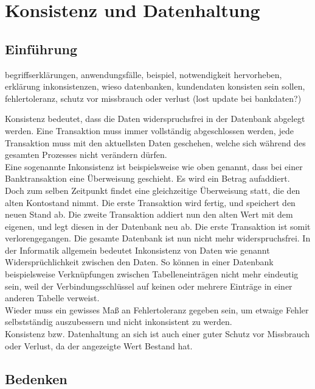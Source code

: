 \documentclass[letterpaper, 12pt]{article}
\let\tempsection\section
\renewcommand\section[1]{\vspace{-0.3cm}\tempsection{#1}\vspace{-0.3cm}}
\let\tempsubsection\subsection
\renewcommand\subsection[1]{\vspace{0cm}\tempsubsection{#1}\vspace{0cm}}
\begin{document}
\clearpage

\section{Konsistenz und Datenhaltung}

\subsection{Einführung}

begriffserklärungen, anwendungsfälle, beispiel, notwendigkeit hervorheben, erklärung inkonsistenzen, wieso datenbanken, kundendaten konsisten sein sollen, fehlertoleranz, schutz vor missbrauch oder verlust (lost update bei bankdaten?)

Konsistenz bedeutet, dass die Daten widerspruchsfrei in der Datenbank abgelegt werden. Eine Transaktion muss immer vollständig abgeschlossen werden, jede Transaktion muss mit den aktuellsten Daten geschehen, welche sich während des gesamten Prozesses nicht verändern dürfen. \\
Eine sogenannte Inkonsistenz ist beispielsweise wie oben genannt, dass bei einer Banktransaktion eine Überweisung geschieht. Es wird ein Betrag aufaddiert. Doch zum selben Zeitpunkt findet eine gleichzeitige Überweisung statt, die den alten Kontostand nimmt. Die erste Transaktion wird fertig, und speichert den neuen Stand ab. Die zweite Transaktion addiert nun den alten Wert mit dem eigenen, und legt diesen in der Datenbank neu ab. Die erste Transaktion ist somit verlorengegangen. Die gesamte Datenbank ist nun nicht mehr widerspruchsfrei. In der Informatik allgemein bedeutet Inkonsistenz von Daten wie genannt Widersprüchlichkeit zwischen den Daten. So können in einer Datenbank beispielsweise Verknüpfungen zwischen Tabelleneinträgen nicht mehr eindeutig sein, weil der Verbindungsschlüssel auf keinen oder mehrere Einträge in einer anderen Tabelle verweist. \\
Wieder muss ein gewisses Maß an Fehlertoleranz gegeben sein, um etwaige Fehler selbstständig auszubessern und nicht inkonsistent zu werden. \\
Konsistenz bzw. Datenhaltung an sich ist auch einer guter Schutz vor Missbrauch oder Verlust, da der angezeigte Wert Bestand hat. \cite{dezsys}

\subsection{Bedenken}
\end{document}

